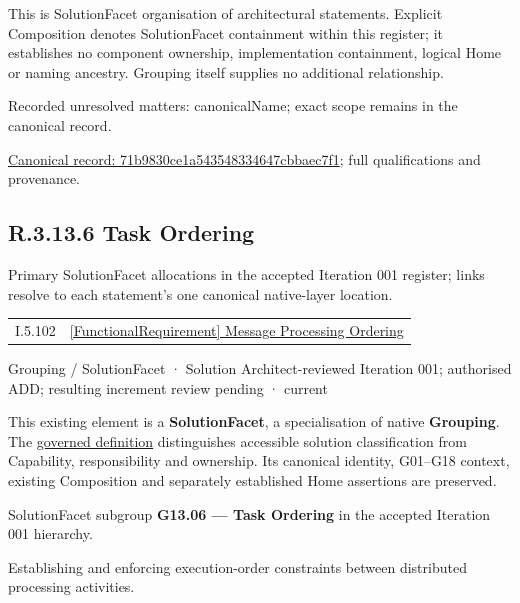This is SolutionFacet organisation of architectural statements. Explicit Composition denotes SolutionFacet containment within this register; it establishes no component ownership, implementation containment, logical Home or naming ancestry. Grouping itself supplies no additional relationship.


{\small Recorded unresolved matters: canonicalName; exact scope remains in the canonical record.}\par
{\footnotesize \href{../../../../../../../continuum/grouping/71b9830ce1a543548334647cbbaec7f1.md}{Canonical record: 71b9830ce1a543548334647cbbaec7f1}; full qualifications and provenance.}\par
\subsection*{R.3.13.6 Task Ordering}
\label{navigation:R.3.13.6}

Primary SolutionFacet allocations in the accepted Iteration 001 register; links resolve to each statement’s one canonical native-layer location.\par
\begin{longtable}{p{.22\linewidth}p{.73\linewidth}}
I.5.102 & \hyperref[element:3c11adccd7194276b787416368c13858]{[FunctionalRequirement] Message Processing Ordering} \\
\end{longtable}
\label{element:0528b2ac76c548ae861ebcb1ef9cf3d9}
{\small Grouping / SolutionFacet · Solution Architect-reviewed Iteration 001; authorised ADD; resulting increment review pending · current}\par

This existing element is a \textbf{SolutionFacet}, a specialisation of native
\textbf{Grouping}. The \href{\detokenize{../../../../../../../governance/continuum-representation.md#solutionfacet-classification--1119-candidate}}{governed definition}
distinguishes accessible solution classification from Capability, responsibility
and ownership. Its canonical identity, G01–G18 context, existing Composition
and separately established Home assertions are preserved.



SolutionFacet subgroup \textbf{G13.06 — Task Ordering} in the accepted Iteration 001 hierarchy.



Establishing and enforcing execution-order constraints between distributed processing activities.



